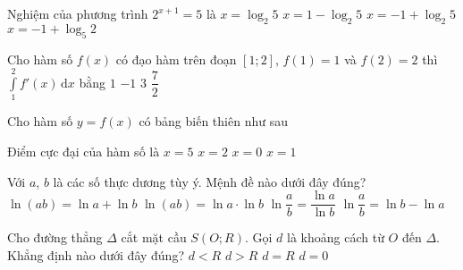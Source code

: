 \begin{ex}%
	Nghiệm của phương trình $2^{x+1}=5$ là
	\choice
	{$x=\log _{2}5$}
	{$x=1-\log _{2}5$}
	{\True $x=-1+\log _{2}5$}
	{$x=-1+\log _{5}2$}
\end{ex}

\begin{ex}%
	Cho hàm số $f(x)$ có đạo hàm trên đoạn $[1;2]$, $f(1)=1$ và $f(2)=2$ thì $\displaystyle\int\limits_1^2 f'(x) \mathrm{\,d}x$ bằng
	\choice
	{\True $1$}
	{$-1$}
	{$3$}
	{$\dfrac{7}{2}$}
\end{ex}

\begin{ex}%
	Cho hàm số $y=f(x)$ có bảng biến thiên như sau
	\begin{center}
	\end{center}
	Điểm cực đại của hàm số là
	\choice
	{$x=5$}
	{\True $x=2$}
	{$x=0$}
	{$x=1$}
\end{ex}

\begin{ex}%
Với $a$, $b$ là các số thực dương tùy ý. Mệnh đề nào dưới đây đúng?
\choice
{\True $\ln (ab)=\ln a+\ln b$}
{$\ln (ab)=\ln a\cdot\ln b$}
{$\ln \dfrac{a}{b}=\dfrac{\ln a}{\ln b}$}
{$\ln \dfrac{a}{b}=\ln b-\ln a$}
\end{ex}

\begin{ex}%
	Cho đường thẳng $\Delta$ cắt mặt cầu $S(O;R)$. Gọi $d$ là khoảng cách từ $O$ đến $\Delta$. Khẳng định nào dưới đây đúng?
	\choice
	{\True $d<R$}
	{$d>R$}
	{$d=R$}
	{$d=0$}
\end{ex}

